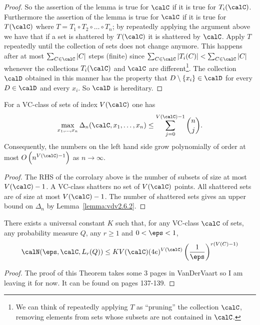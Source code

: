 \begin{proof}
	So the assertion of the lemma is true for \(\calC\) if it is true for \(T_i(\calC)\). Furthermore the assertion of the lemma is true for \(\calC\) if it is true for \(T(\calC)\) where \(T = T_1\circ T_2 \circ \dots\circ T_n\); by repeatedly applying the argument above we have that if a set is shattered by \(T(\calC)\) it is shattered by \(\calC\). Apply \(T\) repeatedly until the collection of sets does not change anymore. This happens after at most \(\sum_{C\in\calC}|C|\) steps (finite) since \(\sum_{C\in\calC} |T_i(C)| < \sum_{C\in\calC} |C|\) whenever the collections \(T_i(\calC)\) and \(\calC\) are different\footnote{We can think of repeatedly applying \(T\) as ``pruning'' the collection \(\calC\), removing elements from sets whose subsets are not contained in \(\calC\).}.  The collection \(\calD\) obtained in this manner has the property that \(D\setminus\{x_i\}\in\calD\) for every
	\(D\in\calD\) and every \(x_i\). So \(\calD\) is hereditary.
\end{proof}

\begin{corollary}
    \label{corr:vdv2.6.3}
	For a VC-class of sets of index \(V(\calC)\) one has
	\[
		\max_{x_1,\dots,x_n} \Delta_n(\calC,x_1,\dots,x_n) \leq \sum_{j=0}^{V(\calC)-1} \binom{n}{j}
	.\]
	Consequently, the numbers on the left hand side grow polynomially of order at most \(O\left(n^{V(\calC)-1}\right)\) as \(n\to\infty\).
\end{corollary}
\begin{proof}
	The RHS of the corrolary above is the number of subsets of size at most \(V(\calC)-1\). A VC-class shatters no set of \(V(\calC)\) points. All shattered sets are of size at most \(V(\calC)-1\). The number of shattered sets gives an upper bound on \(\Delta_n\) by Lemma~\ref{lemma:vdv2.6.2}. 
\end{proof}

\begin{theorem}
	\label{thm:vdv2.6.4}
	There exists a universal constant \(K\) such that, for any VC-class \(\calC\) of sets, any probability measure \(Q\), any \(r \geq 1\) and \(0 < \eps < 1\),
	\begin{equation}
		\label{eq:vdv2.6.4}
		\calN(\eps,\calC,L_r(Q)) \leq KV(\calC)(4e)^{V(\calC)}\left(\frac{1}{\eps} \right)^{r(V(C)-1)}
	\end{equation} 
\end{theorem}
\begin{proof}
	The proof of this Theorem takes some 3 pages in VanDerVaart so I am leaving it for now. It can be found on pages 137-139. 
\end{proof}

